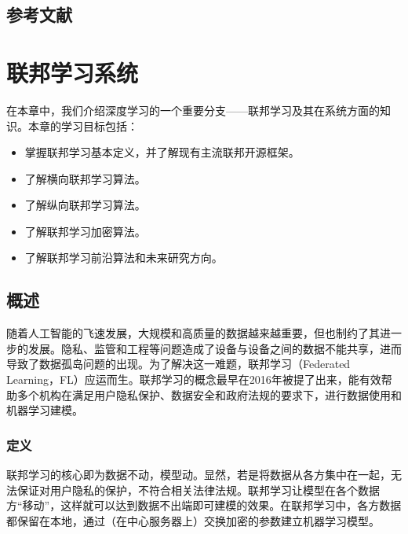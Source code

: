 \documentclass[letterpaper,10pt,english]{sphinxmanual}
\begin{document}
\section{参考文献}
\label{\detokenize{chapter_recommender_system/summary:id3}}
\sphinxAtStartPar



\chapter{联邦学习系统}
\label{\detokenize{chapter_federated_learning/index:id1}}\label{\detokenize{chapter_federated_learning/index::doc}}
\sphinxAtStartPar
在本章中，我们介绍深度学习的一个重要分支——联邦学习及其在系统方面的知识。本章的学习目标包括：
\begin{itemize}
\item {} 
\sphinxAtStartPar
掌握联邦学习基本定义，并了解现有主流联邦开源框架。

\item {} 
\sphinxAtStartPar
了解横向联邦学习算法。

\item {} 
\sphinxAtStartPar
了解纵向联邦学习算法。

\item {} 
\sphinxAtStartPar
了解联邦学习加密算法。

\item {} 
\sphinxAtStartPar
了解联邦学习前沿算法和未来研究方向。

\end{itemize}


\section{概述}
\label{\detokenize{chapter_federated_learning/overview:id1}}\label{\detokenize{chapter_federated_learning/overview::doc}}
\sphinxAtStartPar
随着人工智能的飞速发展，大规模和高质量的数据越来越重要，但也制约了其进一步的发展。隐私、监管和工程等问题造成了设备与设备之间的数据不能共享，进而导致了数据孤岛问题的出现。为了解决这一难题，联邦学习（Federated
Learning，FL）应运而生。联邦学习的概念最早在2016年被提了出来，能有效帮助多个机构在满足用户隐私保护、数据安全和政府法规的要求下，进行数据使用和机器学习建模。


\subsection{定义}
\label{\detokenize{chapter_federated_learning/overview:id2}}
\sphinxAtStartPar
联邦学习的核心即为数据不动，模型动。显然，若是将数据从各方集中在一起，无法保证对用户隐私的保护，不符合相关法律法规。联邦学习让模型在各个数据方“移动”，这样就可以达到数据不出端即可建模的效果。在联邦学习中，各方数据都保留在本地，通过（在中心服务器上）交换加密的参数建立机器学习模型。
\end{document}
